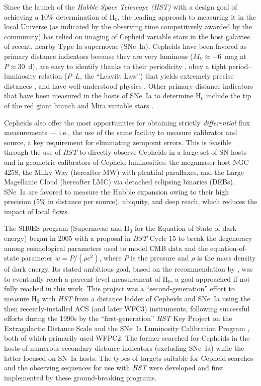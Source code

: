 \documentclass[12pt]{aastex631}
\newcommand{\PL}{$P$--$L$}
\begin{document}
Since the launch of the {\it Hubble Space Telescope (HST)} with a design goal of achieving a 10\% determination of H$_0$, the leading approach to measuring it in the local Universe (as indicated by the observing time competitively awarded by the community) has relied on imaging of Cepheid variable stars in the host galaxies of recent, nearby Type Ia supernovae (SNe~Ia).  Cepheids have been favored as primary distance indicators because they are very luminous ($M_V \approx -6$~mag at $P \approx 30$~d), are easy to identify thanks to their periodicity \citep{Leavitt:1912}, obey a tight period--luminosity relation (\PL, the ``Leavitt Law'') that yields extremely precise distances \citep[3\% per source;][hereafter R19]{Riess:2019b}, and have well-understood physics \citep{Eddington:1917,Bono:1999}.  Other primary distance indicators that have been measured in the hosts of SNe~Ia to determine H$_0$ include the tip of the red giant branch \citep[TRGB;][]{Freedman:2019} and Mira variable stars \citep{Huang:2020}.

Cepheids also offer the most opportunities for obtaining strictly {\it differential} flux measurements --- i.e., the use of the same facility to measure calibrator and source, a key requirement for eliminating zeropoint errors.  This is feasible through the use of {\it HST} to directly observe Cepheids in a large set of SN hosts and in geometric calibrators of Cepheid luminosities: the megamaser host NGC$\,$4258, the Milky Way (hereafter MW) with plentiful parallaxes, and the Large Magellanic Cloud (hereafter LMC) via detached eclipsing binaries (DEBs). SNe~Ia are favored to measure the Hubble expansion owing to their high precision (5\% in distance per source), ubiquity, and deep reach, which reduces the impact of local flows.

The SH0ES program (Supernovae and H$_0$ for the Equation of State of dark energy) began in 2005 with a proposal in {\it HST} Cycle 15 to break the degeneracy among cosmological parameters used to model CMB data and the equation-of-state parameter $w = P/(\rho c^2)$, where $P$ is the pressure and $\rho$ is the mass density of dark energy. Its stated ambitious goal, based on the recommendation by \citet{hu05}, was to eventually reach a percent-level measurement of H$_0$, a goal approached if not fully reached in this work.  This project was a ``second-generation'' effort to measure H$_0$ with  {\it HST}  from a distance ladder of Cepheids and SNe~Ia using the then recently-installed ACS (and later WFC3) instruments, following successful efforts during the 1990s by the ``first-generation'' {\it HST} Key Project on the Extragalactic Distance Scale \citep{freedman01} and the SNe~Ia Luminosity Calibration Program \citep{sandage06}, both of  which primarily used WFPC2.  The former searched for Cepheids in the hosts of numerous secondary distance indicators (excluding SNe~Ia) while the latter focused on SN~Ia hosts. The types of targets suitable for Cepheid searches and the observing sequences for use with  {\it HST}  were developed and first implemented by these ground-breaking programs.  
\end{document}

